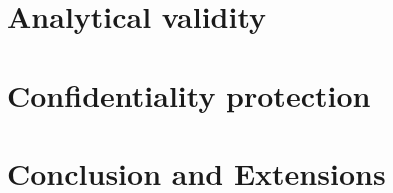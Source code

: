 \documentclass{article}
\begin{document}
\section{Analytical validity}
\label{sec:analytic}


\section{Confidentiality protection}
\label{sec:confidentiality}


\section{Conclusion and Extensions}
\label{sec:conclusion}




\newpage


\printbibliography

\newpage


\end{document}
